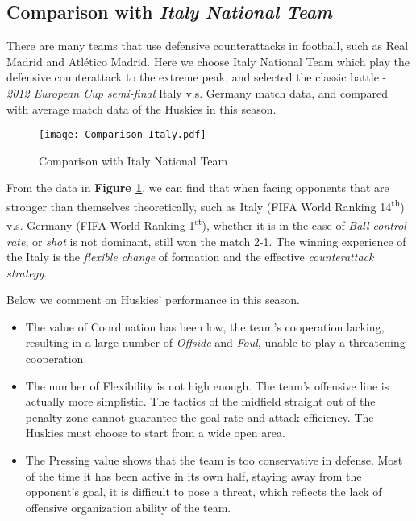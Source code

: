 \documentclass[12pt]{article}  %
\newcommand{\upcite}[1]{\textsuperscript{\textsuperscript{\cite{#1}}}}
\begin{document}
\subsection{Comparison with \textit{Italy National Team}}
There are many teams that use defensive counterattacks in football, such as Real Madrid and Atlético Madrid. Here we choose Italy National Team which play the defensive counterattack to the extreme peak, and selected the classic battle - \textit{2012 European Cup semi-final} Italy v.s. Germany match data\upcite{7}, and compared with  average match data of the Huskies in this season.

\begin{figure}[htbp]
    \centering
    \texttt{[image: Comparison\_Italy.pdf]} 	%
    \caption{Comparison with Italy National Team}		%
    \label{fig:Comparison_Italy}							%
\end{figure}

From the data in \textbf{Figure \ref{fig:Comparison_Italy}}, we can find that when facing  opponents that are stronger than themselves theoretically, such as Italy (FIFA World Ranking 14\textsuperscript{th}) v.s. Germany (FIFA World Ranking 1\textsuperscript{st}), whether it is in the case of \textit{Ball control rate}, or \textit{shot} is not dominant, still won the match 2-1. The winning experience of the Italy is the \textit{flexible change} of formation and the effective \textit{counterattack strategy}\upcite{8}.

Below we comment on Huskies' performance in this season. 
\begin{itemize}
    \setlength{\parsep}{0ex} %
    \setlength{\topsep}{2ex} %
    \setlength{\itemsep}{1ex} %
    \item The value of Coordination has been low, the team's cooperation lacking, resulting in a large number of \textit{Offside} and \textit{Foul}, unable to play a threatening cooperation.
    \item The number of Flexibility is not high enough. The team's offensive line is actually more simplistic. The tactics of the midfield straight out of the penalty zone cannot guarantee the goal rate and attack efficiency. The Huskies must choose to start from a wide open area.
    \item The Pressing value shows that the team is too conservative in defense. Most of the time it has been active in its own half, staying away from the opponent's goal, it is difficult to pose a threat, which reflects the lack of offensive organization ability of the team.
\end{itemize} 
 
\end{document}
